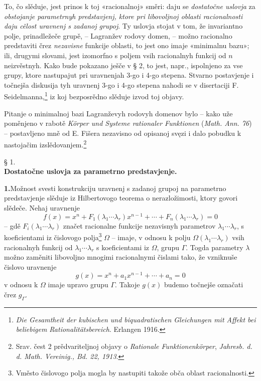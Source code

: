 \documentclass[11pt]{article}
\begin{document}
To, čo slěduje, jest prinos k toj «racionalnoj» směri: daju se {\itshape dostatočne uslovja} za {\itshape obstojanje parametrnyh predstavjenj, ktore pri libovoljnoj oblasti racionalnosti daju cělost uravnenj s zadanoj grupoj}. Ty uslovja stojat v tom, že invariantno polje, prinadležeče grupě, -- Lagranžev rodovy domen, -- možno racionalno predstaviti črez {\itshape nezavisne} funkcije oblasti, to jest ono imaje «minimalnu bazu»; ili, drugymi slovami, jest izomorfno s poljem vsih racionalnyh funkcij od $n$ neizvěstnyh. Kako bude pokazano ješče v § 2, to jest, napr., ispolnjeno za vse grupy, ktore nastupajut pri uravnenjah 3-go i 4-go stepena. Stvarno postavjenje i točnejša diskusija tyh uravnenj 3-go i 4-go stepena nahodi se v disertaciji F. Seidelmanna,\footnote{\emph{Die Gesamtheit der kubischen und biquadratischen Gleichungen mit Affekt bei beliebigem Rationalitätsbereich}. Erlangen 1916.} iz koj bezposrědno slěduje izvod toj objavy.

Pitanje o minimalnoj bazi Lagranževyh rodovyh domenov bylo -- kako uže poměnjeno v rabotě \emph{Körper und Systeme rationaler Funktionen} (\emph{Math. Ann. 76}) -- postavljeno mně od E. Fišera nezavisno od opisanoj svęzi i dalo pobudku k nastojačim izslědovanjem.\footnote{Srav. čest 2 prědvariteljnoj objavy o \emph{Rationale Funktionenkörper}, \emph{Jahresb. d. d. Math. Vereinig., Bd. 22, 1913}.}

\begin{center}
§ 1.\\[0.75\baselineskip]
\textbf{Dostatočne uslovja za parametrno predstavjenje.}
\end{center}

\noindent\textbf{1.}\quad Možnost svesti konstrukciju uravnenj s zadanoj grupoj na parametrno predstavjenje slěduje iz Hilbertovogo teorema o nerazložimosti, ktory govori slědeče. Nehaj uravnenje
\begin{equation}
 f(x)=x^n+F_1(\lambda_1\cdots\lambda_r)x^{n-1}+\cdots+F_n(\lambda_1\cdots\lambda_r)=0
\tag{1}
\end{equation}
-- gdě $F_i(\lambda_1\cdots\lambda_r)$ značet racionalne funkcije nezavisnyh parametrov $\lambda_1\cdots\lambda_r$, s koeficientami iz čislovogo polja\footnote{Vměsto čislovogo polja mogla by nastupiti takože obča oblast racionalnosti.} $\Omega$ -- imaje, v odnosu k polju $\Omega(\lambda_1\cdots\lambda_r)$ vsih racionalnyh funkcij od $\lambda_1\cdots\lambda_r$ s koeficientami iz $\Omega$, grupu $\Gamma$. Togda parametry $\lambda$ možno zaměniti libovoljno mnogimi racionalnymi čislami tako, že vzniknuše čislovo uravnenje
\begin{equation}
 g(x)=x^n+a_1x^{n-1}+\cdots+a_n=0
\tag{2}
\end{equation}
v odnosu k $\Omega$ imaje upravo grupu $\Gamma$. Takoje $g(x)$ budemo točnejše označati črez $g_\Gamma$.
\end{document}
